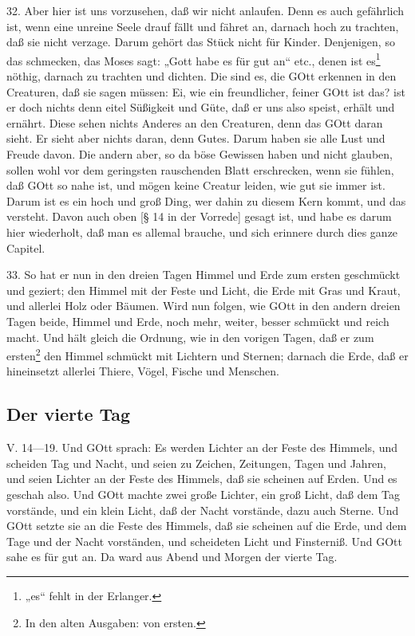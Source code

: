 32. Aber hier ist uns vorzusehen, daß wir nicht anlaufen. Denn es auch gefährlich ist, wenn eine unreine Seele drauf fällt und fähret an, darnach hoch zu trachten, daß sie nicht verzage. Darum gehört das Stück nicht für Kinder. Denjenigen, so das schmecken, das Moses sagt: „Gott habe es für gut an“ etc., denen ist es\footnote{„es“ fehlt in der Erlanger.} nöthig, darnach zu trachten und dichten. Die sind es, die GOtt erkennen in den Creaturen, daß sie sagen müssen: Ei, wie ein freundlicher, feiner GOtt ist das? ist er doch nichts denn eitel Süßigkeit und Güte, daß er uns also speist, erhält und ernährt. Diese sehen nichts Anderes an den Creaturen, denn das GOtt daran sieht. Er sieht aber nichts daran, denn Gutes. Darum haben sie alle Lust und Freude davon. Die andern aber, so da böse Gewissen haben und nicht glauben, sollen wohl vor dem geringsten rauschenden Blatt erschrecken, wenn sie fühlen, daß GOtt so nahe ist, und mögen keine Creatur leiden, wie gut sie immer ist. Darum ist es ein hoch und groß Ding, wer dahin zu diesem Kern kommt, und das versteht. Davon auch oben [§ 14 in der Vorrede] gesagt ist, und habe es darum hier wiederholt, daß man es allemal brauche, und sich erinnere durch dies ganze Capitel.

33. So hat er nun in den dreien Tagen Himmel und Erde zum ersten geschmückt und geziert; den Himmel mit der Feste und Licht, die Erde mit Gras und Kraut, und allerlei Holz oder Bäumen. Wird nun folgen, wie GOtt in den andern dreien Tagen beide, Himmel und Erde,
noch mehr, weiter, besser schmückt und reich macht. Und hält gleich die Ordnung, wie in den vorigen Tagen, daß er zum ersten\footnote{In den alten Ausgaben: von ersten.} den Himmel schmückt mit Lichtern und Sternen; darnach die Erde, daß er hineinsetzt allerlei Thiere, Vögel, Fische und Menschen.

\subsection{Der vierte Tag}

\begin{schriftzitat}
V. 14—19. Und GOtt sprach: Es werden Lichter an der Feste des Himmels, und scheiden Tag und Nacht, und seien zu Zeichen, Zeitungen, Tagen und Jahren, und seien Lichter an der Feste des Himmels, daß sie scheinen auf Erden. Und es geschah also. Und GOtt machte zwei große Lichter, ein groß Licht, daß dem Tag vorstände, und ein klein Licht, daß der Nacht vorstände, dazu auch Sterne. Und GOtt setzte sie an die Feste des Himmels, daß sie scheinen auf die Erde, und dem Tage und der Nacht vorständen, und scheideten Licht und Finsterniß. Und GOtt sahe es für gut an. Da ward aus Abend und Morgen der vierte Tag.
\end{schriftzitat}

